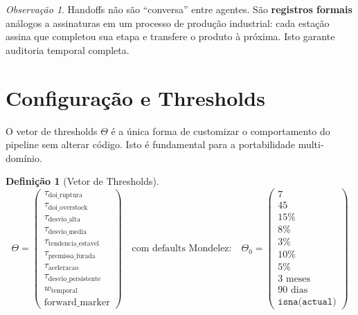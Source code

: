 \documentclass[a4paper, 12pt]{report}
\theoremstyle{definition}
\newtheorem{definicao}{Defini\c{c}\~ao}[chapter]
\theoremstyle{remark}
\newtheorem{observacao}{Observa\c{c}\~ao}[chapter]
\begin{document}
\begin{observacao}
  Handoffs n\~ao s\~ao ``conversa'' entre agentes. S\~ao \textbf{registros formais}
  an\'alogos a assinaturas em um processo de produ\c{c}\~ao industrial: cada
  esta\c{c}\~ao assina que completou sua etapa e transfere o produto
  \`a pr\'oxima. Isto garante auditoria temporal completa.
\end{observacao}


\section{Configura\c{c}\~ao e Thresholds}

O vetor de thresholds $\Theta$ \'e a \'unica forma de customizar o
comportamento do pipeline sem alterar c\'odigo. Isto \'e fundamental
para a portabilidade multi-dom\'inio.

\begin{definicao}[Vetor de Thresholds]
  \[
    \Theta = \begin{pmatrix}
      \tau_{\text{doi\_ruptura}} \\
      \tau_{\text{doi\_overstock}} \\
      \tau_{\text{desvio\_alta}} \\
      \tau_{\text{desvio\_media}} \\
      \tau_{\text{tendencia\_estavel}} \\
      \tau_{\text{premissa\_furada}} \\
      \tau_{\text{aceleracao}} \\
      \tau_{\text{desvio\_persistente}} \\
      w_{\text{temporal}} \\
      \text{forward\_marker}
    \end{pmatrix}
    \quad \text{com defaults Mondelez:} \quad
    \Theta_0 = \begin{pmatrix}
      7 \\
      45 \\
      15\% \\
      8\% \\
      3\% \\
      10\% \\
      5\% \\
      3 \text{ meses} \\
      90 \text{ dias} \\
      \texttt{isna(actual)}
    \end{pmatrix}
  \]
\end{definicao}
\end{document}
